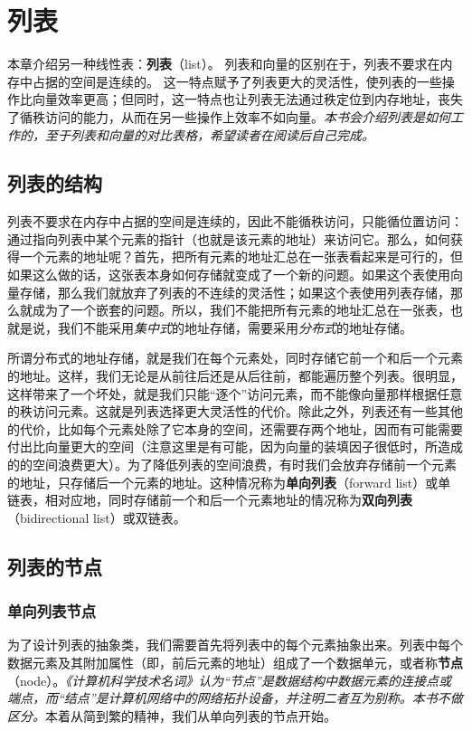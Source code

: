 
\chapter{列表}

本章介绍另一种线性表：\textbf{列表}（list）。
列表和向量的区别在于，列表不要求在内存中占据的空间是连续的。
这一特点赋予了列表更大的灵活性，使列表的一些操作比向量效率更高；但同时，这一特点也让列表无法通过秩定位到内存地址，丧失了循秩访问的能力，从而在另一些操作上效率不如向量。\textit{本书会介绍列表是如何工作的，至于列表和向量的对比表格，希望读者在阅读后自己完成。}

\section{列表的结构}

列表不要求在内存中占据的空间是连续的，因此不能循秩访问，只能循位置访问：通过指向列表中某个元素的指针（也就是该元素的地址）来访问它。那么，如何获得一个元素的地址呢？首先，把所有元素的地址汇总在一张表看起来是可行的，但如果这么做的话，这张表本身如何存储就变成了一个新的问题。如果这个表使用向量存储，那么我们就放弃了列表的不连续的灵活性；如果这个表使用列表存储，那么就成为了一个嵌套的问题。所以，我们不能把所有元素的地址汇总在一张表，也就是说，我们不能采用\textit{集中式}的地址存储，需要采用\textit{分布式}的地址存储。

所谓分布式的地址存储，就是我们在每个元素处，同时存储它前一个和后一个元素的地址。这样，我们无论是从前往后还是从后往前，都能遍历整个列表。很明显，这样带来了一个坏处，就是我们只能“逐个”访问元素，而不能像向量那样根据任意的秩访问元素。这就是列表选择更大灵活性的代价。除此之外，列表还有一些其他的代价，比如每个元素处除了它本身的空间，还需要存两个地址，因而有可能需要付出比向量更大的空间（注意这里是有可能，因为向量的装填因子很低时，所造成的的空间浪费更大）。为了降低列表的空间浪费，有时我们会放弃存储前一个元素的地址，只存储后一个元素的地址。这种情况称为\textbf{单向列表}（forward list）或单链表，相对应地，同时存储前一个和后一个元素地址的情况称为\textbf{双向列表}（bidirectional list）或双链表。

\section{列表的节点}
\subsection{单向列表节点}
\label{lis:单向列表节点}
为了设计列表的抽象类，我们需要首先将列表中的每个元素抽象出来。列表中每个数据元素及其附加属性（即，前后元素的地址）组成了一个数据单元，或者称\textbf{节点}（node）。\textit{《计算机科学技术名词》}\cite{科学技术名词}\textit{认为“节点”是数据结构中数据元素的连接点或端点，而“结点”是计算机网络中的网络拓扑设备，并注明二者互为别称。本书不做区分。}本着从简到繁的精神，我们从单向列表的节点开始。

